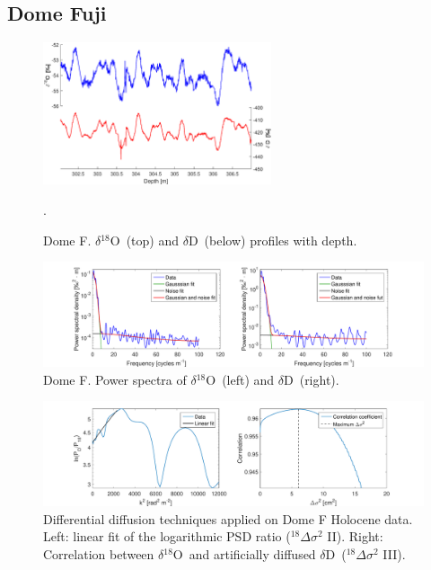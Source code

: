 \documentclass[11pt, draftcls, onecolumn]{IEEEtran} %
\numberwithin{equation}{section}
\numberwithin{table}{section}
\numberwithin{figure}{section}
\newcommand{\delOx}{$\delta{}^{18}\mathrm{O}$}
\newcommand{\delD}{$\delta\mathrm{D}$}
\begin{document}
\begin{appendices}
\clearpage
\subsection{Dome Fuji}

\begin{figure}[H]
	\vspace*{2mm}
	\begin{center}
		\includegraphics[width=0.6\textwidth]{DomeF_holo}
		\caption{Dome F. \delOx~(top) and \delD~(below) profiles with depth.}  \label{fig:DomeF_holo}.
	\end{center}
\end{figure}

\begin{figure}[H]
	\vspace*{2mm}
	\centering
	\includegraphics[width=1\textwidth]{Figure_33}
	\caption{Dome F. Power spectra of \delOx~(left) and \delD~(right).}  \label{fig:DomeF_fig_1}
\end{figure}

\begin{figure}[H]
	\vspace*{2mm}
	\begin{center}
		\includegraphics[width=1\textwidth]{Figure_34}
		\caption{Differential diffusion techniques applied on Dome F Holocene data. 
			Left: linear fit of the logarithmic PSD ratio ($^{18}\Delta\sigma^2$ II). Right: 
			Correlation between \delOx~and artificially diffused \delD~($^{18}\Delta\sigma^2$ III).}  \label{fig:DomeF_fig_2}
	\end{center}
\end{figure}


\end{appendices}
\end{document}
